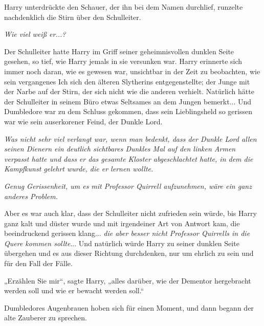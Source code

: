{Harry unterdrückte den Schauer, der ihn bei dem Namen durchlief, runzelte nachdenklich die Stirn über den Schulleiter.

\emph{Wie viel weiß er...?}

Der Schulleiter hatte Harry im Griff seiner geheimnisvollen dunklen Seite gesehen, so tief, wie Harry jemals in sie versunken war. Harry erinnerte sich immer noch daran, wie es gewesen war, unsichtbar in der Zeit zu beobachten, wie sein vergangenes Ich sich den älteren Slytherins entgegenstellte; der Junge mit der Narbe auf der Stirn, der sich nicht wie die anderen verhielt. Natürlich hätte der Schulleiter in seinem Büro etwas Seltsames an dem Jungen bemerkt... Und Dumbledore war zu dem Schluss gekommen, dass sein Lieblingsheld so gerissen war wie sein auserkorener Feind, der Dunkle Lord.

\emph{Was nicht sehr viel verlangt war, wenn man bedenkt, dass der Dunkle Lord allen seinen Dienern ein deutlich sichtbares Dunkles Mal auf den linken Armen verpasst hatte und dass er das gesamte Kloster abgeschlachtet hatte, in dem die Kampfkunst gelehrt wurde, die er lernen wollte.}

\emph{Genug Gerissenheit, um es mit Professor Quirrell aufzunehmen, wäre ein ganz anderes Problem.}

Aber es war auch klar, dass der Schulleiter nicht zufrieden sein würde, bis Harry ganz kalt und düster wurde und mit irgendeiner Art von Antwort kam, die beeindruckend gerissen klang... \emph{die aber besser nicht Professor Quirrells in die Quere kommen sollte}... Und natürlich würde Harry zu seiner dunklen Seite übergehen und es aus dieser Richtung durchdenken, nur um ehrlich zu sein und für den Fall der Fälle.

„Erzählen Sie mir“, sagte Harry, „alles darüber, wie der Dementor hergebracht werden soll und wie er bewacht werden soll.“

Dumbledores Augenbrauen hoben sich für einen Moment, und dann begann der alte Zauberer zu sprechen.

}
